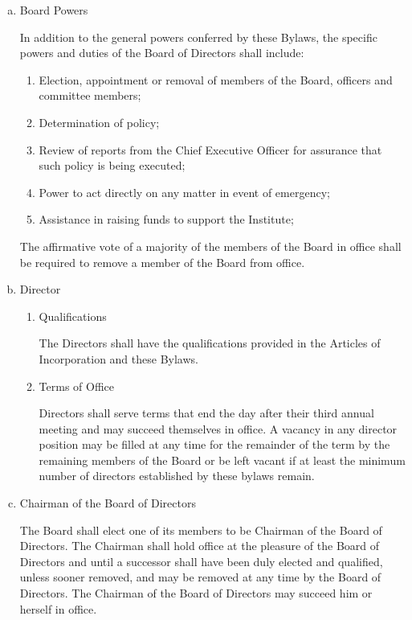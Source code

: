 \begin{enumerate}[(a)]
\item Board Powers

In addition to the general powers conferred by these Bylaws, the specific powers and duties of the Board of Directors shall include:

\begin{enumerate}
\item Election, appointment or removal of members of the Board, officers and committee members; 
\item Determination of policy;
\item Review of reports from the Chief Executive Officer for assurance that such policy is being executed;
\item Power to act directly on any matter in event of emergency;
\item Assistance in raising funds to support the Institute;
\end{enumerate}

The affirmative vote of a majority of the members of the Board in office shall be required to remove a member of the Board from office.

\item Director

\begin{enumerate}
\item Qualifications

The Directors shall have the qualifications provided in the Articles of Incorporation and these Bylaws. 

\item Terms of Office

Directors shall serve terms that end the day after their third annual meeting and may succeed themselves in office.  A vacancy in any director position may be filled at any time for the remainder of the term by the remaining members of the Board or be left vacant if at least the minimum number of directors established by these bylaws remain.

\end{enumerate}

\item Chairman of the Board of Directors

The Board shall elect one of its members to be Chairman of the Board of Directors. The Chairman shall hold office at the pleasure of the Board of Directors and until a successor shall have been duly elected and qualified, unless sooner removed, and may be removed at any time by the Board of Directors. The Chairman of the Board of Directors may succeed him or herself in office.

\end{enumerate}

